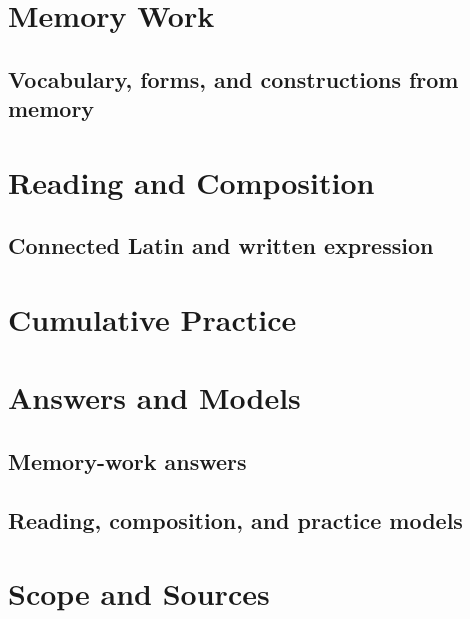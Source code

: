 \clearpage
\part{Memory Work}
\chapter{Vocabulary, forms, and constructions from memory}
\solutionsfalse
\RenderModuleMemoryLearner{\ModuleMemorySet}

\clearpage
\part{Reading and Composition}
\chapter{Connected Latin and written expression}
\solutionsfalse
\RenderModuleReaderSet{\ModuleReaderSet}
\ModulePractice

\clearpage
\part{Cumulative Practice}
\solutionsfalse
\SelectCourseUnits{\ModuleUnit}
\SelectWorksheetVariants{\ModuleWorksheetVariants}
\BeginExerciseBank{\ModuleExerciseBank}

\ModuleReadinessRecord

\clearpage
\part{Answers and Models}

\solutionstrue
\chapter{Memory-work answers}
\RenderModuleMemorySolutions{\ModuleMemorySet}
\chapter{Reading, composition, and practice models}
\RenderModuleReaderSet{\ModuleReaderSet}
\ModulePractice
\SelectCourseUnits{\ModuleUnit}
\SelectWorksheetVariants{\ModuleWorksheetVariants}
\BeginExerciseBank{\ModuleExerciseBank}

\solutionsfalse

\clearpage
\part{Scope and Sources}



{\footnotesize
}


